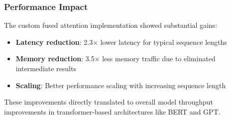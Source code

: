 \subsubsection{Performance Impact}

The custom fused attention implementation showed substantial gains:
\begin{itemize}
    \item \textbf{Latency reduction}: 2.3× lower latency for typical sequence lengths
    \item \textbf{Memory reduction}: 3.5× less memory traffic due to eliminated intermediate results
    \item \textbf{Scaling}: Better performance scaling with increasing sequence length
\end{itemize}

These improvements directly translated to overall model throughput improvements in transformer-based architectures like BERT and GPT.

